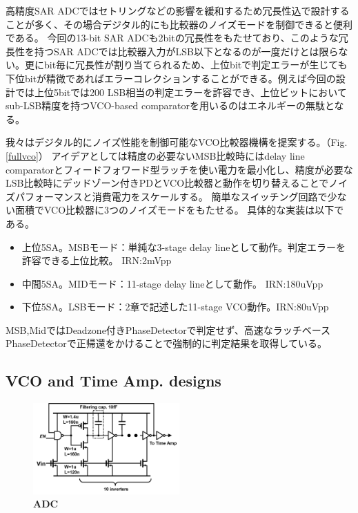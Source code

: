 \documentclass[letterpaper, 10 pt, conference]{ieeeconf}  %
\begin{document}
高精度SAR ADCではセトリングなどの影響を緩和するため冗長性込で設計することが多く、その場合デジタル的にも比較器のノイズモードを制御できると便利である。
今回の13-bit SAR ADCも2bitの冗長性をもたせており、このような冗長性を持つSAR ADCでは比較器入力がLSB以下となるのが一度だけとは限らない。更にbit毎に冗長性が割り当てられるため、上位bitで判定エラーが生じても下位bitが精微であればエラーコレクションすることができる\cite{kapusta201314b}。例えば今回の設計では上位5bitでは200 LSB相当の判定エラーを許容でき、上位ビットにおいてsub-LSB精度を持つVCO-based comparatorを用いるのはエネルギーの無駄となる。

我々はデジタル的にノイズ性能を制御可能なVCO比較器機構を提案する。（Fig.\ref{fullvco}）
アイデアとしては精度の必要ないMSB比較時にはdelay line comparatorとフィードフォワード型ラッチを使い電力を最小化し、精度が必要なLSB比較時にデッドゾーン付きPDとVCO比較器と動作を切り替えることでノイズパフォーマンスと消費電力をスケールする。
簡単なスイッチング回路で少ない面積でVCO比較器に3つのノイズモードをもたせる。
具体的な実装は以下である。
\begin{itemize}
\item 上位5SA。MSBモード：単純な3-stage delay lineとして動作。判定エラーを許容できる上位比較。 IRN:2mVpp
\item 中間5SA。MIDモード：11-stage delay lineとして動作。 IRN:180uVpp
\item 下位5SA。LSBモード：2章で記述した11-stage VCO動作。IRN:80uVpp
\end{itemize}
MSB,MidではDeadzone付きPhaseDetectorで判定せず、高速なラッチベースPhaseDetectorで正帰還をかけることで強制的に判定結果を取得している。

\subsection{VCO and Time Amp. designs}
\begin{figure}[ht!]
\centering
 \includegraphics[width=0.5\textwidth]{figs/vco_cell.png}
  \captionsetup{font=footnotesize}
  \caption{\textbf{ADC}}
  \label{cell}
\end{figure}
\end{document}
